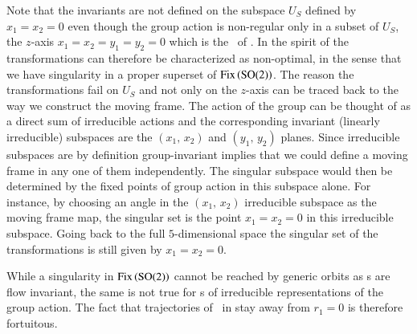 Note that the invariants are not defined on
the subspace $U_S$ defined by $x_1=x_2=0$ even though the
group action is non-regular only in a subset of $U_S$, the
$z$-axis $x_1=x_2=y_1=y_2=0$ which is the \fixedsp\ of .
In the spirit of  the transformations 
can therefore be characterized as non-optimal, in the sense
that we have singularity in a proper superset of $\mathrm{Fix}\left(\textrm{SO}(2)\right)$.
The reason the transformations fail on $U_S$ and not only on the $z$-axis
can be traced back to the way we construct the moving frame. The action
of the group can be thought of as a direct sum of irreducible
actions and the corresponding invariant (linearly irreducible)
subspaces are the $(x_1,\,x_2)$ and $(y_1,\,y_2)$
planes.
Since irreducible subspaces are by definition group-invariant
implies that we could define a moving frame in any one of them
independently. The singular subspace would then be determined
by the fixed points of group action in this subspace alone.
For instance, by choosing an angle in the $(x_1,\,x_2)$ irreducible subspace
as the moving frame map, the singular set is the point
$x_1=x_2=0$ in this irreducible subspace. Going back to the full
$5$-dimensional space the singular set of the transformations
is still given by $x_1=x_2=0$.

While a singularity in $\mathrm{Fix}\left(\textrm{SO}(2)\right)$ cannot be reached by generic orbits
as {\fixedsp s} are flow invariant, the same is not true for {\fixedsp s}
of irreducible representations of the group action.
The fact that trajectories of \cLf\ in  stay away from $r_1=0$ is therefore
fortuitous.
